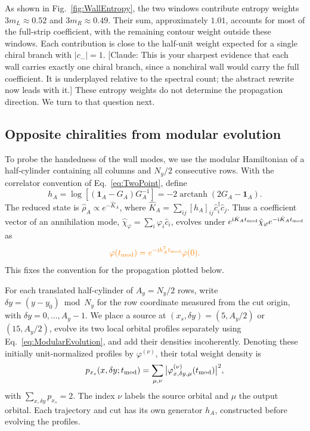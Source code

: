 \documentclass[aps,prb,10pt,twocolumn,superscriptaddress,longbibliography,floatfix]{revtex4-2}
\DeclareMathOperator\arctanh{arctanh}
\newcommand{\ii}{\mathrm{i}}
\newcommand{\Id}{\mathbf{1}}
\newcommand{\newtext}[1]{{\color{blue}#1}}
\newcommand{\claudeadd}[1]{{\color{orange}#1}}
\newcommand{\claudecom}[1]{{\color{ForestGreen}[Claude: #1]}}
\begin{document}
\newtext{As shown in Fig.~\ref{fig:WallEntropy}, the two windows contribute entropy weights $3m_L\approx0.52$ and $3m_R\approx0.49$. Their sum, approximately $1.01$, accounts for most of the full-strip coefficient, with the remaining contour weight outside these windows. Each contribution is close to the half-unit weight expected for a single chiral branch with $|c_-|=1$. \claudecom{This is your sharpest evidence that each wall carries exactly one chiral branch, since a nonchiral wall would carry the full coefficient. It is underplayed relative to the spectral count; the abstract rewrite now leads with it.} These entropy weights do not determine the propagation direction. We turn to that question next.}

{\color{blue}
\subsection{Opposite chiralities from modular evolution}
\label{sec:ModularEvolution}

To probe the handedness of the wall modes, we use the modular Hamiltonian of a half-cylinder containing all columns and $N_y/2$ consecutive rows. With the correlator convention of Eq.~\eqref{eq:TwoPoint}, define
\begin{equation}
 h_A=\log[(\Id_A-G_A)G_A^{-1}]=-2\arctanh(2G_A-\Id_A).
 \label{eq:ModularHamiltonian}
\end{equation}
The reduced state is $\hat\rho_A\propto e^{-\hat K_A}$, where \claudeadd{$\hat K_A=\sum_{ij}[h_A]_{ij}\hat c_i^\dagger\hat c_j$.} Thus a coefficient vector of an annihilation mode, $\hat\chi_\varphi=\sum_i\varphi_i\hat c_i$, evolves under $e^{\ii\hat K_A t_{\rm mod}}\hat\chi_\varphi e^{-\ii\hat K_A t_{\rm mod}}$ as
\begin{equation}
 \claudeadd{\varphi(t_{\rm mod})=e^{-\ii h_A^{\mathsf T} t_{\rm mod}}\varphi(0).}
 \label{eq:ModularEvolution}
\end{equation}
This fixes the convention for the propagation plotted below.

For each translated half-cylinder of $A_y=N_y/2$ rows, write $\delta y=(y-y_0)\bmod N_y$ for the row coordinate measured from the cut origin, with $\delta y=0,\ldots,A_y-1$. We place a source at $(x_s,\delta y)=(5,A_y/2)$ or $(15,A_y/2)$, evolve its two local orbital profiles separately using Eq.~\eqref{eq:ModularEvolution}, and add their densities incoherently. Denoting these initially unit-normalized profiles by $\varphi^{(\nu)}$, their total weight density is
\begin{equation}
 p_{x_s}(x,\delta y;t_{\rm mod})=
 \sum_{\mu,\nu}\big|\varphi^{(\nu)}_{x,\delta y,\mu}(t_{\rm mod})\big|^2,
 \label{eq:ModularPacketDensity}
\end{equation}
with $\sum_{x,\delta y}p_{x_s}=2$. The index $\nu$ labels the source orbital and $\mu$ the output orbital. Each trajectory and cut has its own generator $h_A$, constructed before evolving the profiles.

}
\end{document}
